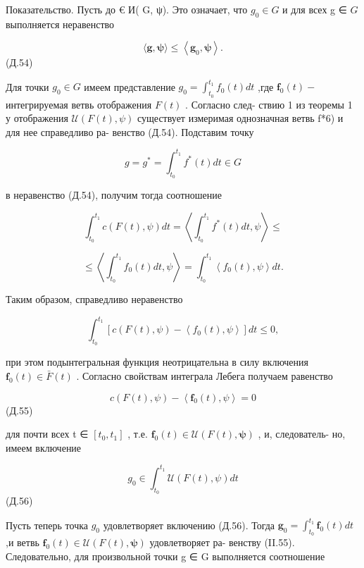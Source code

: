 \documentclass[8pt]{extarticle}
\begin{document}
Показательство. Пусть до € И( G, ψ). Это означает, что \({g}_{0} \in  G\) и для всех g ∈ \(G\) выполняется неравенство

\[
\langle \mathbf{g},\mathbf{\psi }\rangle  \leq  \left\langle  {{\mathbf{g}}_{0},\mathbf{\psi }}\right\rangle  .
\]
 (Д.54)

Для точки \({g}_{0} \in  G\) имеем представление \({g}_{0} = {\int }_{{t}_{0}}^{{t}_{1}}{f}_{0}\left( t\right) {dt}\) ,где \({\mathbf{f}}_{0}\left( t\right)  -\) интегрируемая ветвь отображения \(F\left( t\right)\) . Согласно след- ствию 1 из теоремы 1 у отображения \(\mathcal{U}\left( {F\left( t\right) ,\psi }\right)\) существует измеримая однозначная ветвь f*6) и для нее справедливо ра- венство (Д.54). Подставим точку

\[
g = {g}^{ * } = {\int }_{{t}_{0}}^{{t}_{1}}{f}^{ * }\left( t\right) {dt} \in  G
\]

в неравенство (Д.54), получим тогда соотношение

\[
{\int }_{{t}_{0}}^{{t}_{1}}c\left( {F\left( t\right) ,\psi }\right) {dt} = \left\langle  {{\int }_{{t}_{0}}^{{t}_{1}}{f}^{ * }\left( t\right) {dt},\psi }\right\rangle   \leq
\]

\[
\leq  \left\langle  {{\int }_{{t}_{0}}^{{t}_{1}}{f}_{0}\left( t\right) {dt},\psi }\right\rangle   = {\int }_{{t}_{0}}^{{t}_{1}}\left\langle  {{f}_{0}\left( t\right) ,\psi }\right\rangle  {dt}.
\]

Таким образом, справедливо неравенство

\[
{\int }_{{t}_{0}}^{{t}_{1}}\left\lbrack  {c\left( {F\left( t\right) ,\psi }\right)  - \left\langle  {{f}_{0}\left( t\right) ,\psi }\right\rangle  }\right\rbrack  {dt} \leq  0,
\]

при этом подынтегральная функция неотрицательна в силу включения \({\mathbf{f}}_{0}\left( t\right)  \in  \bar{F}\left( t\right)\) . Согласно свойствам интеграла Лебега получаем равенство

\[
c\left( {F\left( t\right) ,\psi }\right)  - \left\langle  {{\mathbf{f}}_{0}\left( t\right) ,\psi }\right\rangle   = 0
\]
 (Д.55)

для почти всех t ∈ \(\left\lbrack  {{t}_{0},{t}_{1}}\right\rbrack\) , т.е. \({\mathbf{f}}_{0}\left( t\right)  \in  \mathcal{U}\left( {F\left( t\right) ,\mathbf{\psi }}\right)\) , и, следователь- но, имеем включение

\[
{g}_{0} \in  {\int }_{{t}_{0}}^{{t}_{1}}\mathcal{U}\left( {F\left( t\right) ,\psi }\right) {dt}
\]
 (Д.56)

Пусть теперь точка \({g}_{0}\) удовлетворяет включению (Д.56). Тогда \({\mathbf{g}}_{0} = {\int }_{{t}_{0}}^{{t}_{1}}{\mathbf{f}}_{0}\left( t\right) {dt}\) ,и ветвь \({\mathbf{f}}_{0}\left( t\right)  \in  \mathcal{U}\left( {F\left( t\right) ,\mathbf{\psi }}\right)\) удовлетворяет ра- венству (II.55). Следовательно, для произвольной точки g ∈ G выполняется соотношение
\end{document}

